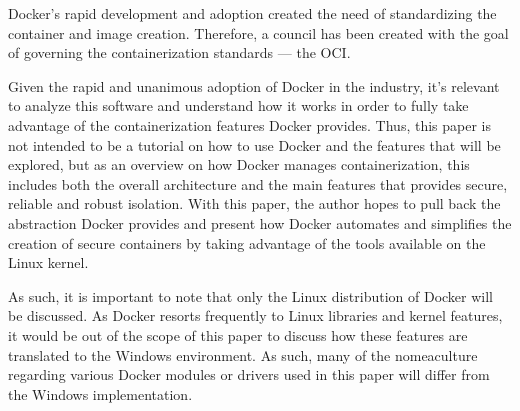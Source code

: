 Docker's rapid development and adoption created the need of standardizing the container and image creation. Therefore, a council has been created with the goal of governing the containerization standards --- the \ac{OCI}.

Given the rapid and unanimous adoption of Docker in the industry, it's relevant to analyze this software and understand how it works in order to fully take advantage of the containerization features Docker provides. Thus, this paper is not intended to be a tutorial on how to use Docker and the features that will be explored, but as an overview on how Docker manages containerization, this includes both the overall architecture and the main features that provides secure, reliable and robust isolation. With this paper, the author hopes to pull back the abstraction Docker provides and present how Docker automates and simplifies the creation of secure containers by taking advantage of the tools available on the Linux kernel. 

As such, it is important to note that only the Linux distribution of Docker will be discussed. As Docker resorts frequently to Linux libraries and kernel features, it would be out of the scope of this paper to discuss how these features are translated to the Windows environment. As such, many of the nomeaculture regarding various Docker modules or drivers used in this paper will differ from the Windows implementation.